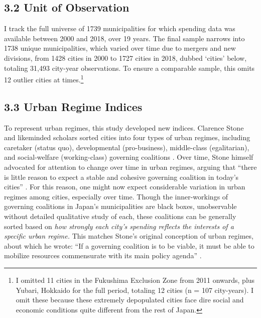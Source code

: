 \documentclass[preprint, 3p,
authoryear]{elsarticle} %
\begin{document}
\hypertarget{unit-of-observation}{%
\subsection{3.2 Unit of Observation}\label{unit-of-observation}}

I track the full universe of 1739 municipalities for which spending data
was available between 2000 and 2018, over 19 years. The final sample
narrows into 1738 unique municipalities, which varied over time due to
mergers and new divisions, from 1428 cities in 2000 to 1727 cities in
2018, dubbed `cities' below, totaling 31,493 city-year observations. To
ensure a comparable sample, this omits 12 outlier cities at
times.\footnote{I omitted 11 cities in the Fukushima Exclusion Zone from
  2011 onwards, plus Yubari, Hokkaido for the full period, totaling 12
  cities (n = 107 city-years). I omit these because these extremely
  depopulated cities face dire social and economic conditions quite
  different from the rest of Japan.}

\hypertarget{urban-regime-indices}{%
\subsection{3.3 Urban Regime Indices}\label{urban-regime-indices}}

To represent urban regimes, this study developed new indices. Clarence
Stone and likeminded scholars sorted cities into four types of urban
regimes, including caretaker (status quo), developmental (pro-business),
middle-class (egalitarian), and social-welfare (working-class) governing
coalitions
\citep{stone_1989, stoker_and_mossberger_1994, mossberger_and_stoker_2001, kilburn_2004, de_socio_2007}.
Over time, Stone himself advocated for attention to change over time in
urban regimes, arguing that ``there is little reason to expect a stable
and cohesive governing coalition in today's cities''
\citep{stone_et_al_2015}. For this reason, one might now expect
considerable variation in urban regimes among cities, especially over
time. Though the inner-workings of governing coalitions in Japan's
municipalities are black boxes, unobservable without detailed
qualitative study of each, these coalitions can be generally sorted
based on \emph{how strongly each city's spending reflects the interests
of a specific urban regime.} This matches Stone's original conception of
urban regimes, about which he wrote: ``If a governing coalition is to be
viable, it must be able to mobilize resources commensurate with its main
policy agenda'' \citep{stone_1993}.
\end{document}
